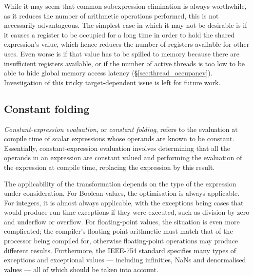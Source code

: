 
While it may seem that common subexpression elimination is always worthwhile, as
it reduces the number of arithmetic operations performed, this is not
necessarily advantageous. The simplest case in which it may not be desirable is
if it causes a register to be occupied for a long time in order to hold the
shared expression's value, which hence reduces the number of registers available
for other uses. Even worse is if that value has to be spilled to memory because
there are insufficient registers available, or if the number of active threads
is too low to be able to hide global memory access latency
(\S\ref{sec:thread_occupancy}). Investigation of this tricky target-dependent
issue is left for future work.


\subsection{Constant folding}
\label{sec:constant_folding}

\emph{Constant-expression evaluation}, or \emph{constant folding}, refers to the
evaluation at compile time of scalar expressions whose operands are known to be
constant. Essentially, constant-expression evaluation involves determining that
all the operands in an expression are constant valued and performing the
evaluation of the expression at compile time, replacing the expression by this
result.

The applicability of the transformation depends on the type of the expression
under consideration. For Boolean values, the optimisation is always applicable.
For integers, it is almost always applicable, with the exceptions being cases
that would produce run-time exceptions if they were executed, such as division
by zero and underflow or overflow. For floating-point values, the situation is
even more complicated; the compiler's floating point arithmetic must match that
of the processor being compiled for, otherwise floating-point operations may
produce different results. Furthermore, the IEEE-754 standard specifies many
types of exceptions and exceptional values --- including infinities, NaNs and
denormalised values --- all of which should be taken into account.


